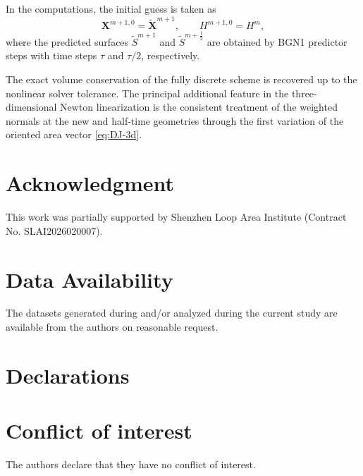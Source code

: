 \documentclass[smallextended]{svjour3}
\numberwithin{equation}{section}
\begin{document}
	In the computations, the initial guess is taken as
	\[
	\mathbf{X}^{m+1,0}=\widetilde{\mathbf{X}}^{m+1},
	\qquad
	H^{m+1,0}=H^m,
	\]
	where the predicted surfaces $\widetilde{S}^{m+1}$ and $\widetilde{S}^{m+\frac12}$ are obtained by BGN1 predictor steps with time steps $\tau$ and $\tau/2$, respectively.
	
	\begin{remark}
		The exact volume conservation of the fully discrete scheme is recovered up to the nonlinear solver tolerance. The principal additional feature in the three-dimensional Newton linearization is the consistent treatment of the weighted normals at the new and half-time geometries through the first variation of the oriented area vector \eqref{eq:DJ-3d}.
	\end{remark}

	\section*{Acknowledgment}
	This work was partially supported by Shenzhen Loop Area Institute (Contract No. SLAI2026020007).

	\section*{Data Availability}
	The datasets generated during and/or analyzed during the current study are available from
	the authors on reasonable request.
	\section*{Declarations}
	\section*{Conflict of interest}
	The authors declare that they have no conflict of interest.
	
	
	
	
\end{document}
